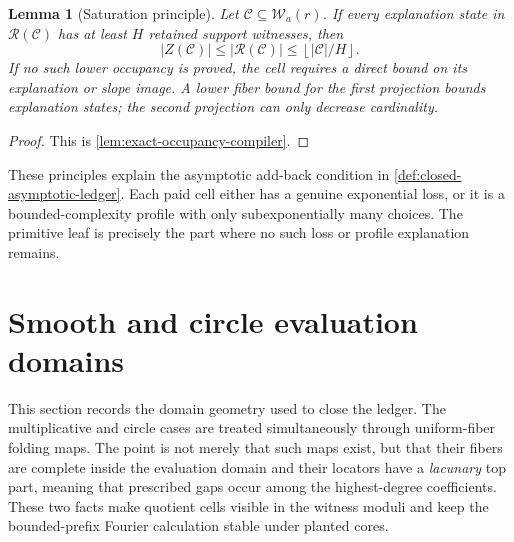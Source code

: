 \documentclass[12pt,a4paper]{amsart}
\numberwithin{equation}{section}
\newtheorem{lemma}[lemma]{Lemma}
\theoremstyle{remark}
\newcommand{\Ccal}{\mathcal C}
\newcommand{\Rcal}{\mathcal R}
\newcommand{\Wcal}{\mathcal W}
\newcommand{\abs}[1]{\lvert #1\rvert}
\newcommand{\floor}[1]{\left\lfloor #1\right\rfloor}
\begin{document}
\begin{lemma}[Saturation principle]\label{lem:saturation-principle}
Let \(\Ccal\subseteq\Wcal_a(r)\).  If every explanation state in
\(\Rcal(\Ccal)\) has at least \(H\) retained support witnesses, then
\[
 \abs{Z(\Ccal)}\le\abs{\Rcal(\Ccal)}
 \le\floor{\abs{\Ccal}/H}.
\]
If no such lower occupancy is proved, the cell requires a direct bound on
its explanation or slope image.  A lower fiber bound for the first
projection bounds explanation states; the second projection can only
decrease cardinality.
\end{lemma}

\begin{proof}
This is \cref{lem:exact-occupancy-compiler}.
\end{proof}

These principles explain the asymptotic add-back condition in \cref{def:closed-asymptotic-ledger}.  Each paid cell either has a genuine exponential loss, or it is a bounded-complexity profile with only subexponentially many choices.  The primitive leaf is precisely the part where no such loss or profile explanation remains.


\section{Smooth and circle evaluation domains}\label{sec:smooth-circle-domains}

This section records the domain geometry used to close the ledger.  The
multiplicative and circle cases are treated simultaneously through
uniform-fiber folding maps.  The point is not merely that such maps exist,
but that their fibers are complete inside the evaluation domain and their
locators have a \emph{lacunary} top part, meaning that prescribed gaps occur
among the highest-degree coefficients.  These two facts make quotient
cells visible in the witness moduli and keep the bounded-prefix Fourier
calculation stable under planted cores.
\end{document}
